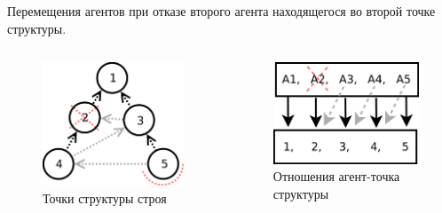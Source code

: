 \documentclass[10pt]{beamer}
\begin{document}
\begin{frame}[noframenumbering]
	Перемещения агентов при отказе второго агента находящегося во второй точке структуры.
	\begin{columns}
		\begin{figure}
			\centering
			\includegraphics[width=1\linewidth]{platoon/agents-ordering-platoon}
			\caption{Точки структуры строя}
			\label{fig:agents-ordering-platoon}
		\end{figure}

		\begin{figure}
			\centering
			\includegraphics[width=1\linewidth]{platoon/agents-ordering}
			\caption{Отношения агент-точка структуры}
			\label{fig:agents-ordering}
		\end{figure}
		
	\end{columns}
\end{frame}
\end{document}
